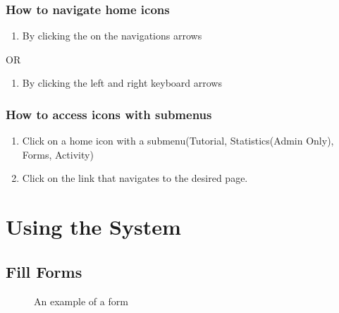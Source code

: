 \documentclass[14pt, a4paper]{article}
\begin{document}
	\subsubsection{How to navigate home icons}
		\begin{enumerate}
			\item By clicking the on the navigations arrows
		\end{enumerate}
		\begin{center} OR \end{center}
		\begin{enumerate}
			\item By clicking the left and right keyboard arrows
		\end{enumerate}
	\subsubsection{How to access icons with submenus}
		\begin{enumerate}
			\item Click on a home icon with a submenu(Tutorial, Statistics(Admin Only), Forms, Activity)
			\item Click on the link that navigates to the desired page.
		\end{enumerate}



\section{Using the System}
\subsection{Fill Forms}
	\begin{figure}[H]
		\centerline{}
		\caption{An example of a form}
		\label{fig:forms1}
	\end{figure}
\end{document}
